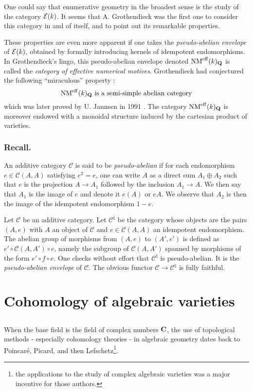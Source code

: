 \documentclass[../main.tex]{subfiles}
\begin{document}
One could say that enumerative geometry in the broadest sense is the study of the category $\mathcal{E}(k)$.
It seems that A. Grothendieck was the first one to consider this category in and of itself, and to point out its remarkable properties.

These properties are even more apparent if one takes the \emph{pseudo-abelian envelope} of $\mathcal{E}(k)$, obtained by formally introducing kernels of idempotent endomorphisms.
In Grothendieck's lingo, this pseudo-abelian envelope denoted $\operatorname{NM}^{\mathrm{eff}}(k)_{\mathbf{Q}}$ is called the \emph{category of effective numerical motives}.
Grothendieck had conjectured the following \enquote{miraculous} property :
$$\operatorname{NM}^{\mathrm{eff}}(k)_{\mathbf{Q}} \text{ is a semi-simple abelian category}$$
which was later proved by U. Jannsen in 1991 \cite{jannsen92}.
The category $\operatorname{NM}^{\mathrm{eff}}(k)_{\mathbf{Q}}$ is moreover endowed with a monoidal structure induced by the cartesian product of varieties.

\subsubsection{Recall.} An additive category $\mathcal{C}$ is said to be \emph{pseudo-abelian} if for each endomorphism $e \in \mathcal{C}(A, A)$ satisfying $e^2 = e$, one can write $A$ as a direct sum $A_1 \oplus A_2$ such that $e$ is the projection $A \to A_1$ followed by the inclusion $A_1 \to A$.
We then say that $A_1$ is the image of $e$ and denote it $e(A)$ or $eA$. We observe that $A_2$ is then the image of the idempotent endomorphism $1 - e$.

Let $\mathcal{C}$ be an additive category.
Let $\mathcal{C}^{\natural}$ be the category whose objects are the pairs $(A, e)$ with $A$ an object of $\mathcal{C}$ and $e \in \mathcal{C}(A, A)$ an idempotent endomorphism.
The abelian group of morphisms from $(A, e)$ to $(A', e')$ is defined as $e' \circ \mathcal{C}(A, A') \circ e$, namely the subgroup of $\mathcal{C}(A, A')$ spanned by morphisms of the form $e' \circ f \circ e$.
One checks without effort that $\mathcal{C}^{\natural}$ is pseudo-abelian.
It is the \emph{pseudo-abelian envelope} of $\mathcal{C}$.
The obvious functor $\mathcal{C} \to \mathcal{C}^{\natural}$ is fully faithful.

\section{Cohomology of algebraic varieties}

\subsection{} When the base field is the field of complex numbers $\mathbf{C}$, the use of topological methods - especially cohomology theories - in algebraic geometry dates back to Poincaré, Picard, and then Lefschetz\footnote{the applications to the study of complex algebraic varieties was a major incentive for those authors.}.
\end{document}
